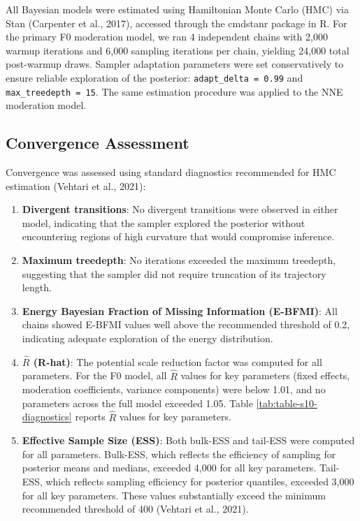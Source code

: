 \documentclass[
  english,
  man,floatsintext]{apa6}
\begin{document}
All Bayesian models were estimated using Hamiltonian Monte Carlo (HMC) via Stan (Carpenter et al., 2017), accessed through the cmdstanr package in R. For the primary F0 moderation model, we ran 4 independent chains with 2,000 warmup iterations and 6,000 sampling iterations per chain, yielding 24,000 total post-warmup draws. Sampler adaptation parameters were set conservatively to ensure reliable exploration of the posterior: \texttt{adapt\_delta\ =\ 0.99} and \texttt{max\_treedepth\ =\ 15}. The same estimation procedure was applied to the NNE moderation model.

\subsection{Convergence Assessment}\label{convergence-assessment}

Convergence was assessed using standard diagnostics recommended for HMC estimation (Vehtari et al., 2021):

\begin{enumerate}
\def\labelenumi{\arabic{enumi}.}
\item
  \textbf{Divergent transitions}: No divergent transitions were observed in either model, indicating that the sampler explored the posterior without encountering regions of high curvature that would compromise inference.
\item
  \textbf{Maximum treedepth}: No iterations exceeded the maximum treedepth, suggesting that the sampler did not require truncation of its trajectory length.
\item
  \textbf{Energy Bayesian Fraction of Missing Information (E-BFMI)}: All chains showed E-BFMI values well above the recommended threshold of 0.2, indicating adequate exploration of the energy distribution.
\item
  \textbf{\(\hat{R}\) (R-hat)}: The potential scale reduction factor was computed for all parameters. For the F0 model, all \(\hat{R}\) values for key parameters (fixed effects, moderation coefficients, variance components) were below 1.01, and no parameters across the full model exceeded 1.05. Table \ref{tab:table-s10-diagnostics} reports \(\hat{R}\) values for key parameters.
\item
  \textbf{Effective Sample Size (ESS)}: Both bulk-ESS and tail-ESS were computed for all parameters. Bulk-ESS, which reflects the efficiency of sampling for posterior means and medians, exceeded 4,000 for all key parameters. Tail-ESS, which reflects sampling efficiency for posterior quantiles, exceeded 3,000 for all key parameters. These values substantially exceed the minimum recommended threshold of 400 (Vehtari et al., 2021).
\end{enumerate}
\end{document}
